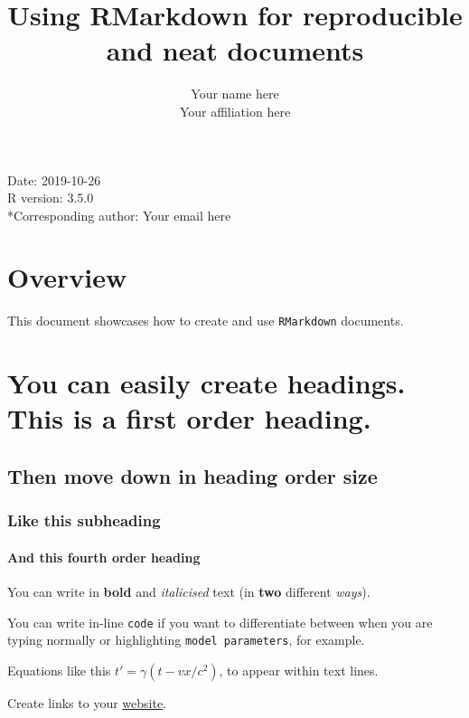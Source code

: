 \documentclass[article]{article}
\title{Using RMarkdown for reproducible and neat documents}
\author{Your name here\\
Your affiliation here}
\date{}
\let\oldparagraph\paragraph
\renewcommand{\paragraph}[1]{\oldparagraph{#1}\mbox{}}
\begin{document}
\maketitle

{
\hypersetup{linkcolor=black}
\setcounter{tocdepth}{4}
\tableofcontents
}
\newpage   

Date: 2019-10-26\\
R version: 3.5.0\\
*Corresponding author: Your email here

\newpage

\section{Overview}\label{overview}

This document showcases how to create and use \texttt{RMarkdown}
documents.

\section{You can easily create headings. This is a first order
heading.}\label{you-can-easily-create-headings.-this-is-a-first-order-heading.}

\subsection{Then move down in heading order
size}\label{then-move-down-in-heading-order-size}

\subsubsection{Like this subheading}\label{like-this-subheading}

\paragraph{And this fourth order
heading}\label{and-this-fourth-order-heading}

You can write in \textbf{bold} and \emph{italicised} text (in
\textbf{two} different \emph{ways}).

You can write in-line \texttt{code} if you want to differentiate between
when you are typing normally or highlighting \texttt{model\ parameters},
for example.

Equations like this \(t' = \gamma(t - vx/c^{2})\), to appear within text
lines.

Create links to your \href{https://github.com/darwinanddavis}{website}.
\end{document}
